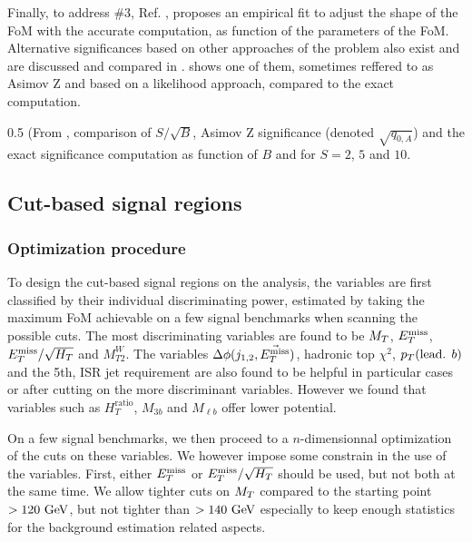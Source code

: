     Finally, to address \#3, Ref. \cite{Punzi}, proposes an empirical fit to adjust the
    shape of the FoM with the accurate computation, as function of the parameters
    of the FoM. Alternative significances based on other approaches of the problem also
    exist and are discussed and compared in .
     shows one of them, sometimes reffered to as Asimov Z and based on a
    likelihood approach, compared to the exact computation.

                 {0.5}
                 {(From , comparison of $S/\sqrt{B}$,
                 Asimov Z significance (denoted $\sqrt{q_{0,A}}$) and the exact significance computation
                 as function of $B$ and for $S = 2$, $5$ and $10$.}

        \subsection{Cut-based signal regions}

            \subsubsection{Optimization procedure}

    To design the cut-based signal regions on the analysis, the variables are first
    classified by their individual discriminating power, estimated by taking the
    maximum FoM achievable on a few signal benchmarks when scanning the possible
    cuts. The most discriminating variables are found to be $M_T$, $E_T^\text{miss}$,
    $E_T^\text{miss}/\sqrt{H_T}$ and $M_{T2}^{W}$. The variables $\Delta \phi(j_{1,2},\vec{E_T^\text{miss}})$,
    hadronic top $\chi^2$, $p_T(\text{lead. } b)$ and the 5th, ISR jet requirement are
    also found to be helpful in particular cases or after cutting on the more discriminant
    variables. However we found that variables such as $H_T^\text{ratio}$, $M_{3b}$ and
    $M_{\ell b}$ offer lower potential.

    On a few signal benchmarks, we then proceed to a $n$-dimensionnal optimization of the
    cuts on these variables. We however impose some constrain in the use of the variables.
    First, either $E_T^\text{miss}$ or $E_T^\text{miss}/\sqrt{H_T}$ should be used, but not both at the same time.
    We allow tighter cuts on $M_T$ compared to the starting point $> 120~\text{GeV}$, but not
    tighter than $> 140~\text{GeV}$ especially to keep enough statistics for the background
    estimation related aspects.

